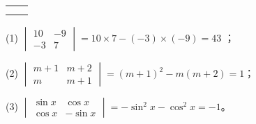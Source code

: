 \begin{xiaoxiaotis}

    \begin{tabular}[t]{*{2}{@{}p{16em}}}
         &  \\[1.5em]
    \end{tabular}

\end{xiaoxiaotis}

\jie
(1) $\begin{vmatrix}
        10 & -9 \\
        -3 & 7
    \end{vmatrix} = 10 \times 7 - (-3) \times (-9) = 43$ ；

(2) $\begin{vmatrix}
        m+1 & m+2 \\
        m   & m+1
    \end{vmatrix} = (m + 1)^2 - m(m + 2) = 1$；

(3) $\begin{vmatrix}
        \sin x & \cos x \\
        \cos x & -\sin x
    \end{vmatrix} = -\sin^2x - \cos^2x = -1$。


